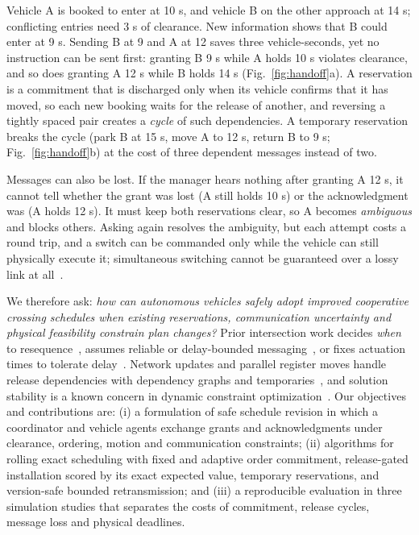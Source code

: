 \documentclass[10pt]{article}
\begin{document}
Vehicle A is booked to enter at 10 s, and vehicle B on the other approach at 14 s; conflicting entries need 3 s of clearance. New information shows that B could enter at 9 s. Sending B at 9 and A at 12 saves three vehicle-seconds, yet no instruction can be sent first: granting B 9 s while A holds 10 s violates clearance, and so does granting A 12 s while B holds 14 s (Fig.~\ref{fig:handoff}a). A reservation is a commitment that is discharged only when its vehicle confirms that it has moved, so each new booking waits for the release of another, and reversing a tightly spaced pair creates a \emph{cycle} of such dependencies. A temporary reservation breaks the cycle (park B at 15 s, move A to 12 s, return B to 9 s; Fig.~\ref{fig:handoff}b) at the cost of three dependent messages instead of two.

Messages can also be lost. If the manager hears nothing after granting A 12 s, it cannot tell whether the grant was lost (A still holds 10 s) or the acknowledgment was (A holds 12 s). It must keep both reservations clear, so A becomes \emph{ambiguous} and blocks others. Asking again resolves the ambiguity, but each attempt costs a round trip, and a switch can be commanded only while the vehicle can still physically execute it; simultaneous switching cannot be guaranteed over a lossy link at all~\cite{twogenerals}.

We therefore ask: \emph{how can autonomous vehicles safely adopt improved cooperative crossing schedules when existing reservations, communication uncertainty and physical feasibility constrain plan changes?} Prior intersection work decides \emph{when} to resequence~\cite{chalaki2022,vitale2023,berndt2024}, assumes reliable or delay-bounded messaging~\cite{zheng19,au2011}, or fixes actuation times to tolerate delay~\cite{crossroads}. Network updates and parallel register moves handle release dependencies with dependency graphs and temporaries~\cite{reitblatt2012,jin2014,rideau2008}, and solution stability is a known concern in dynamic constraint optimization~\cite{petcu2007}. Our objectives and contributions are:
(i) a formulation of safe schedule revision in which a coordinator and vehicle agents exchange grants and acknowledgments under clearance, ordering, motion and communication constraints;
(ii) algorithms for rolling exact scheduling with fixed and adaptive order commitment, release-gated installation scored by its exact expected value, temporary reservations, and version-safe bounded retransmission; and
(iii) a reproducible evaluation in three simulation studies that separates the costs of commitment, release cycles, message loss and physical deadlines.
\end{document}
